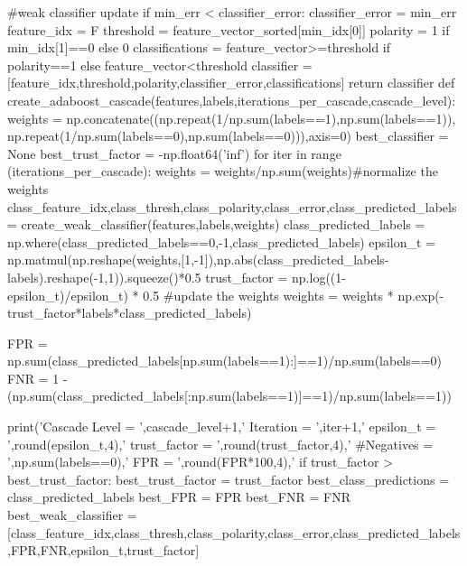 \documentclass{article}
\begin{document}
\begin{python}
		#weak classifier update
		if min_err < classifier_error:
			classifier_error = min_err
			feature_idx = F
			threshold = feature_vector_sorted[min_idx[0]]
			polarity = 1 if min_idx[1]==0 else 0
			classifications = feature_vector>=threshold if polarity==1 else feature_vector<threshold
			classifier = [feature_idx,threshold,polarity,classifier_error,classifications]
	return classifier
def create_adaboost_cascade(features,labels,iterations_per_cascade,cascade_level):
	weights = np.concatenate((np.repeat(1/np.sum(labels==1),np.sum(labels==1)), np.repeat(1/np.sum(labels==0),np.sum(labels==0))),axis=0)
	best_classifier = None
	best_trust_factor = -np.float64('inf')
	for iter in range (iterations_per_cascade):
		weights = weights/np.sum(weights)#normalize the weights
		class_feature_idx,class_thresh,class_polarity,class_error,class_predicted_labels = create_weak_classifier(features,labels,weights)
		class_predicted_labels = np.where(class_predicted_labels==0,-1,class_predicted_labels)
		epsilon_t = np.matmul(np.reshape(weights,[1,-1]),np.abs(class_predicted_labels-labels).reshape(-1,1)).squeeze()*0.5
		trust_factor = np.log((1-epsilon_t)/epsilon_t) * 0.5
		#update the weights
		weights = weights * np.exp(-trust_factor*labels*class_predicted_labels)

		FPR = np.sum(class_predicted_labels[np.sum(labels==1):]==1)/np.sum(labels==0)
		FNR = 1 - (np.sum(class_predicted_labels[:np.sum(labels==1)]==1)/np.sum(labels==1))

		print('Cascade Level = ',cascade_level+1,' Iteration = ',iter+1,' epsilon_t = ',round(epsilon_t,4),' trust_factor = ',round(trust_factor,4),' #Negatives = ',np.sum(labels==0),' FPR = ',round(FPR*100,4),'%
		if trust_factor > best_trust_factor:
			best_trust_factor = trust_factor
			best_class_predictions = class_predicted_labels
			best_FPR = FPR
			best_FNR = FNR
			best_weak_classifier = [class_feature_idx,class_thresh,class_polarity,class_error,class_predicted_labels,FPR,FNR,epsilon_t,trust_factor]


\end{python}
\end{document}
